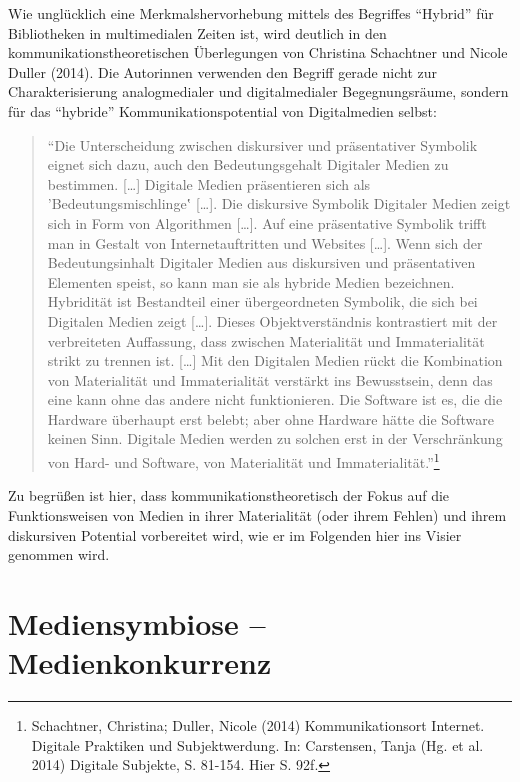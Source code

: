 \documentclass[a4paper,
fontsize=11pt,
oneside,
numbers=noperiodatend,
parskip=half-,
bibliography=totoc,
final
]{scrartcl}
\begin{document}
Wie unglücklich eine Merkmalshervorhebung mittels des Begriffes
\enquote{Hybrid} für Bibliotheken in multimedialen Zeiten ist, wird
deutlich in den kommunikationstheoretischen Überlegungen von Christina
Schachtner und Nicole Duller (2014). Die Autorinnen verwenden den
Begriff gerade nicht zur Charakterisierung analogmedialer und
digitalmedialer Begegnungsräume, sondern für das \enquote{hybride}
Kommunikationspotential von Digitalmedien selbst:

\begin{quote}
\enquote{Die Unterscheidung zwischen diskursiver und präsentativer
Symbolik eignet sich dazu, auch den Bedeutungsgehalt Digitaler Medien zu
bestimmen. {[}\ldots{}{]} Digitale Medien präsentieren sich als
'Bedeutungsmischlinge‛ {[}\ldots{}{]}. Die diskursive Symbolik Digitaler
Medien zeigt sich in Form von Algorithmen {[}\ldots{}{]}. Auf eine
präsentative Symbolik trifft man in Gestalt von Internetauftritten und
Websites {[}\ldots{}{]}. Wenn sich der Bedeutungsinhalt Digitaler Medien
aus diskursiven und präsentativen Elementen speist, so kann man sie als
hybride Medien bezeichnen. Hybridität ist Bestandteil einer
übergeordneten Symbolik, die sich bei Digitalen Medien zeigt
{[}\ldots{}{]}. Dieses Objektverständnis kontrastiert mit der
verbreiteten Auffassung, dass zwischen Materialität und Immaterialität
strikt zu trennen ist. {[}\ldots{}{]} Mit den Digitalen Medien rückt die
Kombination von Materialität und Immaterialität verstärkt ins
Bewusstsein, denn das eine kann ohne das andere nicht funktionieren. Die
Software ist es, die die Hardware überhaupt erst belebt; aber ohne
Hardware hätte die Software keinen Sinn. Digitale Medien werden zu
solchen erst in der Verschränkung von Hard- und Software, von
Materialität und Immaterialität.}\footnote{Schachtner, Christina;
  Duller, Nicole (2014) Kommunikationsort Internet. Digitale Praktiken
  und Subjektwerdung. In: Carstensen, Tanja (Hg. et al. 2014) Digitale
  Subjekte, S. 81-154. Hier S. 92f.}
\end{quote}

Zu begrüßen ist hier, dass kommunikationstheoretisch der Fokus auf die
Funktionsweisen von Medien in ihrer Materialität (oder ihrem Fehlen) und
ihrem diskursiven Potential vorbereitet wird, wie er im Folgenden hier
ins Visier genommen wird.

\section*{Mediensymbiose --
Medienkonkurrenz}\label{mediensymbiose-medienkonkurrenz}
\end{document}
